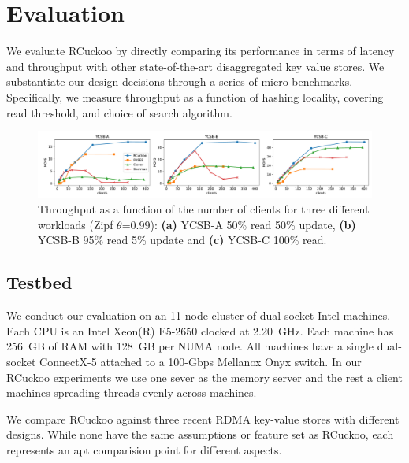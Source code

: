 \section{Evaluation}
\label{sec:eval}

We evaluate RCuckoo by directly comparing its performance in terms of
latency and throughput with other state-of-the-art disaggregated key
value stores. We substantiate our design decisions through a series of
micro-benchmarks. Specifically, we measure throughput as a function of
hashing locality, covering read threshold, and choice of search
algorithm.



\begin{figure}[ht]
    \includegraphics[width=0.99\linewidth]{fig/hero_ycsb_throughput.pdf}

    \caption{Throughput as a function of the number of clients for three different workloads (Zipf $\theta$=0.99): \textbf{(a)} YCSB-A 50\%
    read 50\% update, \textbf{(b)} YCSB-B 95\% read 5\% update and \textbf{(c)}
    YCSB-C 100\% read.}
    \label{fig:ycsb_throughput}
 \end{figure}


\subsection{Testbed}

We conduct our evaluation on an 11-node cluster of dual-socket Intel
machines. Each CPU is an Intel Xeon(R) E5-2650 clocked at
2.20~GHz. Each machine has 256~GB of RAM with 128~GB per NUMA
node. All machines have a single dual-socket ConnectX-5 attached to a
100-Gbps Mellanox Onyx switch. In our RCuckoo experiments we use one
sever as the memory server and the rest a client machines
spreading threads evenly across machines.


We compare RCuckoo against three recent RDMA key-value stores with
different designs.  While none have the same assumptions or feature
set as RCuckoo, each represents an apt comparision point for different
aspects.

